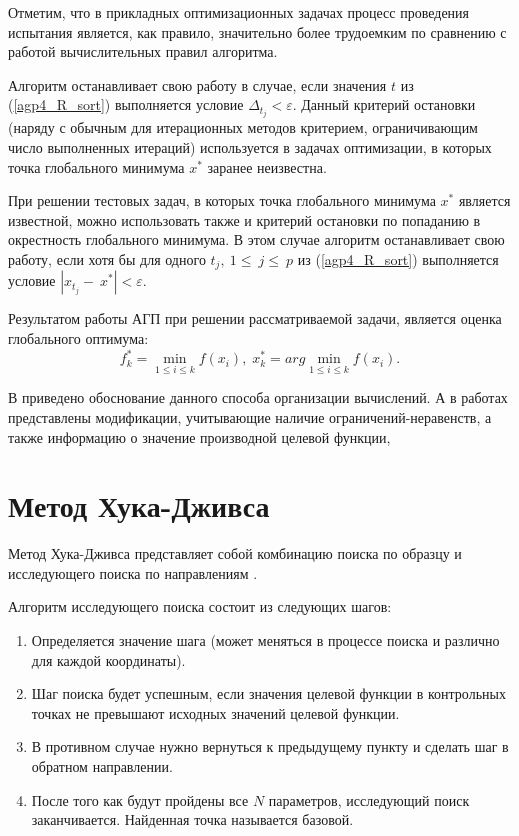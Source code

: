 \documentclass[12pt, a4paper, russian]{article}
\begin{document}
Отметим, что в прикладных оптимизационных задачах процесс проведения испытания является, как правило, значительно более трудоемким по сравнению с работой вычислительных правил алгоритма.

Алгоритм останавливает свою работу в случае, если значения $t$ из (\ref{agp4_R_sort}) выполняется условие \(\Delta_{t_j} < \varepsilon\). Данный критерий остановки (наряду с обычным для итерационных методов критерием, ограничивающим число выполненных итераций) используется в задачах оптимизации, в которых точка глобального минимума $x^*$ заранее неизвестна. 
	 
При решении тестовых задач, в которых точка глобального минимума $x^*$ является  известной, можно использовать также и критерий остановки по попаданию в окрестность глобального минимума. В этом случае алгоритм останавливает свою работу, если хотя бы для одного $t_j,\ 1\le\ j\le\ p$ из (\ref{agp4_R_sort}) выполняется условие $\left|x_{t_j}-\ x^\ast\right| < \varepsilon.$
	
Результатом работы АГП при решении рассматриваемой задачи, является оценка глобального оптимума:
\begin{equation}
f_k^*=\min_{1\leq i \leq k}f(x_i), \; x_k^*=arg \min_{1\leq i \leq k}f(x_i).
\end{equation}



В \cite{fio_bib20} приведено обоснование данного способа организации вычислений. А в работах  \cite{fio_bib9, fio_bib11} представлены модификации, учитывающие наличие ограничений-неравенств, а также информацию о значение производной целевой функции, 


\section{Метод Хука-Дживса}

 Метод Хука-Дживса представляет собой комбинацию поиска по образцу и исследующего поиска по направлениям  \cite{fio_bib14, fio_bib15}.


Алгоритм исследующего поиска состоит из следующих шагов: 
\begin{enumerate}
\item	Определяется значение шага (может меняться в процессе поиска и различно для каждой координаты).

\item	Шаг поиска будет успешным, если значения целевой функции в контрольных точках не превышают исходных значений целевой функции.

\item	В противном случае нужно вернуться к предыдущему пункту и сделать шаг в обратном направлении. 

\item	После того как будут пройдены все $N$ параметров, исследующий поиск заканчивается. Найденная точка называется базовой.
\end{enumerate}
\end{document}
